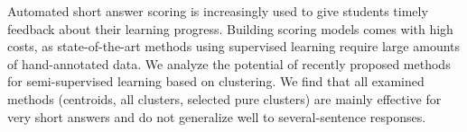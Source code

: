 Automated short answer scoring is increasingly used to give students timely feedback about their learning progress. Building scoring models comes with high costs, as state-of-the-art methods using supervised learning require large amounts of hand-annotated data. We analyze the potential of recently proposed methods for semi-supervised learning based on clustering. We find that all examined methods (centroids, all clusters, selected pure clusters) are mainly effective for very short answers and do not generalize well to several-sentence responses.
